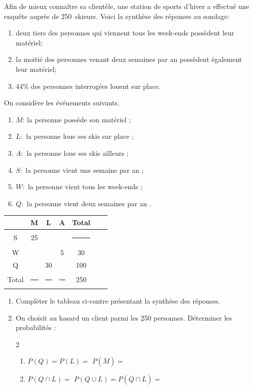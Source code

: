 \documentclass[main.tex]{subfiles}
\begin{document}
\begin{exercise} 
	Afin de mieux connaître sa clientèle, une station de sports d'hiver a 
	effectué une enquête auprès de 250~skieurs. 
	Voici la synthèse des réponses au sondage:
	\begin{enumerate}[label=\textbullet, leftmargin=*]
		\item deux tiers des personnes qui viennent tous les week-ends possèdent 
		leur matériel;
		\item  la moitié des personnes venant deux semaines par an possèdent 
		également leur matériel;
		\item   44\% des personnes interrogées louent sur place.
	\end{enumerate} 
	\noindent\parbox{0.6\linewidth}{ 
	On considère les événements suivants.
\begin{enumerate}[label=\textbullet,leftmargin=*]
			\item $M$: \og la personne possède son matériel \fg;
			\item $L:$ \og la personne loue ses skis sur place \fg; 
			\item $A:$ \og la personne loue ses skis ailleurs \fg; 
			\item $S:$ \og la personne vient une semaine par an \fg;
			\item $W:$ \og la personne vient tous les week-ends \fg;
			\item $Q:$ \og la personne vient deux semaines par an \fg.
	\end{enumerate}
	}\hfill 
	\parbox{0.4\linewidth}{
		\renewcommand{\arraystretch}{1.5} 
		\begin{tabular}{|c|c|c|c|c|c|c|}
			\hline
			& M & L & A & Total \\\hline
			S & 25 &  &  & \rule{1.8em}{0pt} \\\hline
			W &  &  & 5 & 30 \\\hline
			Q &  & 30 &  & 100 \\\hline
			Total & \rule{1.8em}{0pt} &\rule{1.8em}{0pt}  &  \rule{1.8em}{0pt}& 250\\\hline
		\end{tabular}
	}
	\begin{enumerate}[label=\arabic*), leftmargin=*] 
		\item Compléter le tableau ci-contre présentant la synthèse des réponses.
		\item On choisit au hasard un client parmi les 250 personnes.  Déterminer les probabilités :
		\vspace{-0.5em}
		\begin{spacing}{2}
		\begin{enumerate}[label={},leftmargin=*]
			\item   $P(Q)=$\dotfill    $P(L)=$\dotfill
			   $P(\overline{M})=$\dotfill 
			   \item	$P(Q\cap L)=$\dotfill 
			  $P(Q\cup L)=$\dotfill  $P(\overline{Q}\cap L)=$\dotfill
		\end{enumerate}  
		\end{spacing}
	\vspace{-1em} 
	\end{enumerate}
\end{exercise}
\end{document}
